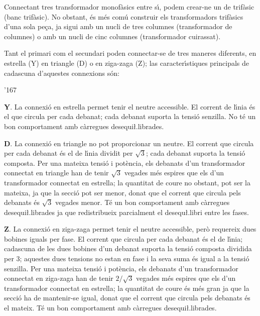 Connectant tres transformador monof\`{a}sics entre s\'{\i}, podem crear-ne un de trif\`{a}sic (banc trif\`{a}sic). No obstant, \'{e}s m\'{e}s com\'{u} construir els transformadors trif\`{a}sics d'una sola pe\c{c}a, ja sigui amb un nucli de tres columnes (transformador de columnes) o amb un nucli de cinc columnes (transformador cuirassat).

Tant el primari com el secundari poden connectar-se de tres maneres diferents, en estrella (Y) en triangle (D) o en ziga-zaga (Z); las caracter\'{\i}stiques principals de cadascuna d'aquestes connexions s\'{o}n:

\begin{dinglist}{'167}
   \item \textbf{Y}. La connexi\'{o} en estrella permet tenir el neutre accessible. El corrent de l\'{\i}nia \'{e}s el que circula per cada debanat; cada debanat suporta la tensi\'{o} senzilla. No t\'{e} un bon comportament amb c\`{a}rregues desequi{\l.l}ibrades.
   \item \textbf{D}. La connexi\'{o} en triangle no pot proporcionar un neutre. El corrent que circula per cada debanat \'{e}s el de l\'{\i}nia dividit per $\sqrt{3}$; cada debanat suporta la tensi\'{o} composta. Per una mateixa tensi\'{o} i pot\`{e}ncia, els debanats d'un transformador connectat en triangle han de tenir $\sqrt{3}$ vegades m\'{e}s espires que els d'un transformador connectat en estrella; la quantitat de coure no obstant, pot ser la mateixa, ja que la secci\'{o} pot ser menor, donat que el corrent que circula pels debanats \'{e}s $\sqrt{3}$ vegades menor. T\'{e} un bon comportament amb c\`{a}rregues desequi{\l.l}ibrades ja que redistribueix parcialment el desequ{\l.l}ibri entre les fases.
   \item \textbf{Z}. La connexi\'{o} en ziga-zaga permet tenir el neutre accessible, per\`{o} requereix dues bobines iguals per fase. El corrent que circula per cada debanat \'{e}s el de l\'{\i}nia; cadascuna de les dues bobines d'un debanat suporta la tensi\'{o} composta dividida per 3; aquestes dues tensions no estan en fase i la seva suma \'{e}s igual a la tensi\'{o} senzilla. Per una mateixa tensi\'{o} i pot\`{e}ncia, els debanats d'un transformador connectat en ziga-zaga han de tenir $2/\sqrt{3}$ vegades m\'{e}s espires que els d'un transformador connectat en estrella; la quantitat de coure \'{e}s m\'{e}s gran ja que la secci\'{o} ha de mantenir-se igual, donat que el corrent que circula pels debanats \'{e}s el mateix. T\'{e} un bon comportament amb c\`{a}rregues desequi{\l.l}ibrades.
\end{dinglist}


